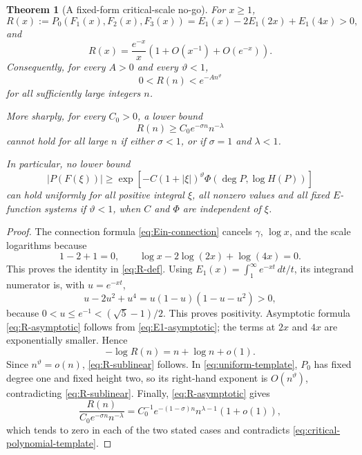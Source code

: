 \documentclass[11pt]{article}
\newtheorem{theorem}{Theorem}[section]
\theoremstyle{definition}
\theoremstyle{remark}
\begin{document}
\begin{theorem}[A fixed-form critical-scale no-go]
\label{thm:sublinear-no-go}
For \(x\ge1\),
\begin{equation}\label{eq:R-def}
 R(x):=P_0(F_1(x),F_2(x),F_3(x))
 =E_1(x)-2E_1(2x)+E_1(4x)>0,
\end{equation}
and
\begin{equation}\label{eq:R-asymptotic}
 R(x)=\frac{e^{-x}}x
 \left(1+O(x^{-1})+O(e^{-x})\right).
\end{equation}
Consequently, for every \(A>0\) and every \(\vartheta<1\),
\begin{equation}\label{eq:R-sublinear}
 0<R(n)<e^{-An^\vartheta}
\end{equation}
for all sufficiently large integers \(n\).

More sharply, for every \(C_0>0\), a lower bound
\begin{equation}\label{eq:critical-polynomial-template}
 R(n)\ge C_0e^{-\sigma n}n^{-\lambda}
\end{equation}
cannot hold for all large \(n\) if either \(\sigma<1\), or if
\(\sigma=1\) and \(\lambda<1\).

In particular, no lower bound
\begin{equation}\label{eq:uniform-template}
 |P(F(\xi))|\ge
 \exp\!\left[-C(1+|\xi|)^\vartheta
 \Phi(\deg P,\log H(P))\right]
\end{equation}
can hold uniformly for all positive integral \(\xi\), all nonzero values and
all fixed \(E\)-function systems if \(\vartheta<1\), when \(C\) and \(\Phi\)
are independent of \(\xi\).
\end{theorem}

\begin{proof}
The connection formula \eqref{eq:Ein-connection} cancels \(\gamma\),
\(\log x\), and the scale logarithms because
\[
 1-2+1=0,
 \qquad
 \log x-2\log(2x)+\log(4x)=0.
\]
This proves the identity in \eqref{eq:R-def}.  Using
\(E_1(x)=\int_1^\infty e^{-xt}\,dt/t\), its integrand numerator is, with
\(u=e^{-xt}\),
\[
 u-2u^2+u^4=u(1-u)(1-u-u^2)>0,
\]
because \(0<u\le e^{-1}<(\sqrt5-1)/2\).  This proves positivity.
Asymptotic formula \eqref{eq:R-asymptotic} follows from
\eqref{eq:E1-asymptotic}; the terms at \(2x\) and \(4x\) are exponentially
smaller.  Hence
\[
 -\log R(n)=n+\log n+o(1).
\]
Since \(n^\vartheta=o(n)\), \eqref{eq:R-sublinear} follows.  In
\eqref{eq:uniform-template}, \(P_0\) has fixed degree one and fixed height
two, so its right-hand exponent is \(O(n^\vartheta)\), contradicting
\eqref{eq:R-sublinear}.
Finally, \eqref{eq:R-asymptotic} gives
\[
 \frac{R(n)}{C_0e^{-\sigma n}n^{-\lambda}}
 =C_0^{-1}e^{-(1-\sigma)n}n^{\lambda-1}(1+o(1)),
\]
which tends to zero in each of the two stated cases and contradicts
\eqref{eq:critical-polynomial-template}.
\end{proof}
\end{document}
